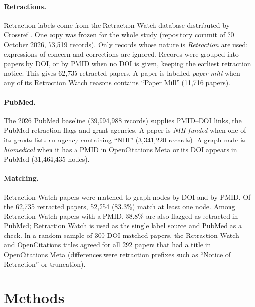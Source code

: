 \documentclass[pdflatex,sn-basic]{sn-jnl}
\begin{document}
\paragraph{Retractions.} Retraction labels come from the Retraction Watch database distributed by Crossref
\citep{rittman2025rw}. One copy was frozen for the whole study (repository commit of 30 October 2026, 73,519 records).
Only records whose nature is \emph{Retraction} are used; expressions of concern and corrections are ignored. Records
were grouped into papers by DOI, or by PMID when no DOI is given, keeping the earliest retraction notice. This gives
62,735 retracted papers. A paper is labelled \emph{paper mill} when any of its Retraction Watch reasons contains ``Paper
Mill'' (11,716 papers).

\paragraph{PubMed.} The 2026 PubMed baseline (39,994,988 records) supplies PMID--DOI links, the PubMed retraction flags
and grant agencies. A paper is \emph{NIH-funded} when one of its grants lists an agency containing ``NIH''
(3,341,220 records). A graph node is \emph{biomedical} when it has a PMID in OpenCitations Meta or its DOI appears in
PubMed (31,464,435 nodes).

\paragraph{Matching.} Retraction Watch papers were matched to graph nodes by DOI and by PMID. Of the 62,735 retracted
papers, 52,254 (83.3\%) match at least one node. Among Retraction Watch papers with a PMID, 88.8\% are also flagged as
retracted in PubMed; Retraction Watch is used as the single label source and PubMed as a check. In a random sample of 300 DOI-matched papers,
the Retraction Watch and OpenCitations titles agreed for all 292 papers that had a title in OpenCitations Meta
(differences were retraction prefixes such as ``Notice of Retraction'' or truncation).

\section{Methods}\label{sec:methods}
\end{document}
